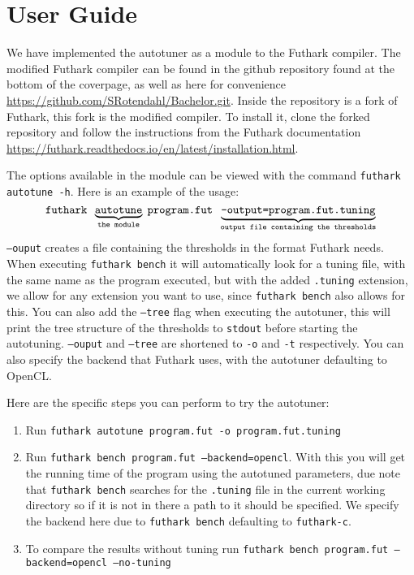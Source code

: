 \section{User Guide}
We have implemented the autotuner as a module to the Futhark compiler.
The modified Futhark compiler can be found in the github repository found at the bottom of the
coverpage, as well as here for convenience \url{https://github.com/SRotendahl/Bachelor.git}. Inside the repository is a fork of Futhark, this fork is the modified compiler. To install it, clone the forked repository and follow the instructions from the Futhark documentation \url{https://futhark.readthedocs.io/en/latest/installation.html}.

The options available in the module can be viewed with the command 
\texttt{futhark autotune -h}. Here is an example of the usage:
$$\text{\texttt{futhark }}\underbrace{\texttt{autotune}}_\text{\texttt{the module}}\;
\text{\texttt{program.fut }} \underbrace{\texttt{--output=program.fut.tuning}}_
\text{\texttt{output file containing the thresholds}}$$
\texttt{--ouput} creates a file containing the thresholds in the format Futhark needs. 
When executing \texttt{futhark bench} it will automatically look for a tuning file, 
with the same name as the program executed, but with the added \texttt{.tuning} extension, 
we allow for any extension you want to use, since \texttt{futhark bench} also allows for this.
You can also add the \texttt{--tree} flag when executing the autotuner, this will print the
tree structure of the thresholds to \texttt{stdout} before starting the autotuning. 
\texttt{--ouput} and \texttt{--tree} are shortened to \texttt{-o} and \texttt{-t} respectively.
You can also specify the backend that Futhark uses, with the autotuner defaulting to OpenCL.

Here are the specific steps you can perform to try the autotuner:
\begin{enumerate}
\item Run \texttt{futhark autotune program.fut -o program.fut.tuning}
\item Run \texttt{futhark bench program.fut --backend=opencl}. With this you will get the 
running time of the program using the autotuned parameters, due note that \texttt{futhark bench} searches for the \texttt{.tuning} file in the current working directory so if it is not in there a path to it should be specified. We specify the backend here due to \texttt{futhark bench} defaulting to \texttt{futhark-c}.
\item To compare the results without tuning run \texttt{futhark bench program.fut --backend=opencl --no-tuning}
\end{enumerate}